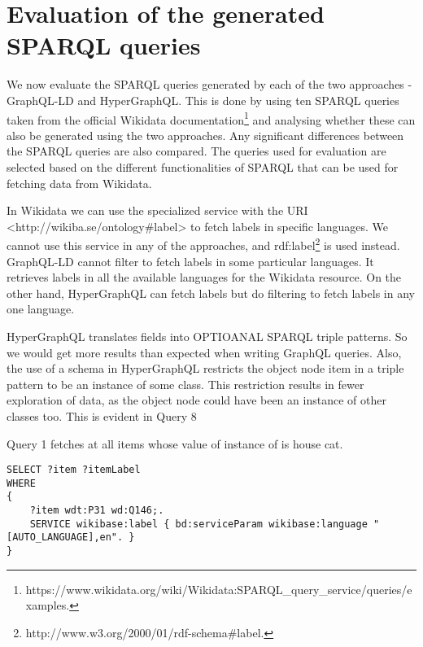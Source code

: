 \chapter{Evaluation of the generated SPARQL queries}

We now evaluate the SPARQL queries generated by each of the two approaches - GraphQL-LD and HyperGraphQL. This is done by using ten SPARQL queries taken from the official Wikidata documentation\footnote{https://www.wikidata.org/wiki/Wikidata:SPARQL\_query\_service/queries/examples.} and analysing whether these can also be generated using the two approaches. Any significant differences between the SPARQL queries are also compared. The queries used for evaluation are selected based on the different functionalities of SPARQL that can be used for fetching data from Wikidata.

In Wikidata we can use the specialized service with the URI <http://wikiba.se/ontology\#label> to fetch labels in specific languages. We cannot use this service in any of the approaches, and rdf:label\footnote{http://www.w3.org/2000/01/rdf-schema\#label.} is used instead. GraphQL-LD cannot filter to fetch labels in some particular languages. It retrieves labels in all the available languages for the Wikidata resource. On the other hand, HyperGraphQL can fetch labels but do filtering to fetch labels in any one language. 

HyperGraphQL translates fields into OPTIOANAL SPARQL triple patterns. So we would get more results than expected when writing GraphQL queries. Also, the use of a schema in HyperGraphQL restricts the object node item in a triple pattern to be an instance of some class. This restriction results in fewer exploration of data, as the object node could have been an instance of other classes too. This is evident in Query 8

Query 1 fetches at all items whose value of instance of is house cat.

\begin{minipage}{\linewidth}
\begin{lstlisting}[label=listing:listing34, caption={Query 1}]
SELECT ?item ?itemLabel
WHERE
{
    ?item wdt:P31 wd:Q146;.
    SERVICE wikibase:label { bd:serviceParam wikibase:language "[AUTO_LANGUAGE],en". }
}
\end{lstlisting}
\end{minipage}


